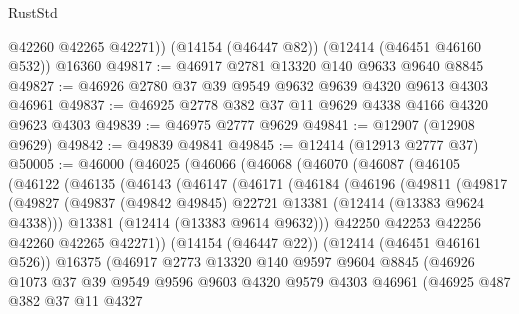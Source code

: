 \begin{lexlean}{RustStd}
\begin{coremodule}
        @42260
        @42265
        @42271))
    (@14154 (@46447 @82))
    (@12414 (@46451 @46160 @532))
    @16360
@49817 := @46917 @2781 @13320 @140 @9633 @9640 @8845
@49827 := @46926 @2780 @37 @39 @9549 @9632 @9639 @4320 @9613 @4303 @46961
@49837 := @46925 @2778 @382 @37 @11 @9629 @4338 @4166 @4320 @9623 @4303
@49839 := @46975 @2777 @9629
@49841 := @12907 (@12908 @9629)
@49842 := @49839 @49841
@49845 := @12414 (@12913 @2777 @37)
@50005 := @46000
    (@46025
      (@46066
        (@46068
          (@46070
            (@46087
              (@46105
                (@46122
                  (@46135
                    (@46143
                      (@46147
                        (@46171
                          (@46184
                            (@46196
                              (@49811
                                (@49817
                                  (@49827
                                    (@49837
                                      (@49842 @49845)
                                      @22721
                                      @13381
                                      (@12414 (@13383 @9624 @4338)))
                                    @13381
                                    (@12414 (@13383 @9614 @9632)))
                                  @42250
                                  @42253
                                  @42256
                                  @42260
                                  @42265
                                  @42271))
                              (@14154 (@46447 @22))
                              (@12414 (@46451 @46161 @526))
                              @16375
                              (@46917
                                @2773
                                @13320
                                @140
                                @9597
                                @9604
                                @8845
                                (@46926
                                  @1073
                                  @37
                                  @39
                                  @9549
                                  @9596
                                  @9603
                                  @4320
                                  @9579
                                  @4303
                                  @46961
                                  (@46925
                                    @487
                                    @382
                                    @37
                                    @11
                                    @4327

\end{coremodule}
\end{lexlean}
